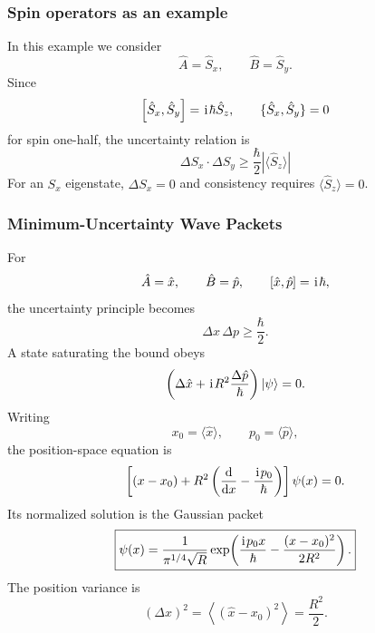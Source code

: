 \subsubsection{Spin operators as an example}
In this example we consider
\begin{equation}
 \hat A=\hat S_x,
 \qquad
 \hat B=\hat S_y.
\end{equation}
Since
\begin{equation}
 \left[\hat S_x,\hat S_y\right]=\hspace{1pt}\mathrm{i}\hspace{1pt}\hbar\hat S_z,
 \qquad
 \{\hat S_x,\hat S_y\}=0
\end{equation}
for spin one-half, the uncertainty relation is
\begin{equation}
 \Delta S_x\cdot \Delta S_y
 \geq\frac{\hbar}{2}|\langle\hat S_z\rangle|
\end{equation}
For an $S_x$ eigenstate, $\Delta S_x=0$ and consistency requires
$\langle\hat S_z\rangle=0$.

\subsubsection{Minimum-Uncertainty Wave Packets}
For
\begin{equation}
 \hat A=\hat x,
 \qquad
 \hat B=\hat p,
 \qquad
 \left[\hat x,\hat p\right]=\hspace{1pt}\mathrm{i}\hspace{1pt}\hbar,
\end{equation}
the uncertainty principle becomes
\begin{equation}
 \boxed{\Delta x\,\Delta p\geq\frac{\hbar}{2}.}
\end{equation}
A state saturating the bound obeys
\begin{equation}
 \left(\Delta\hat x+\hspace{1pt}\mathrm{i}\hspace{1pt} R^2\frac{\Delta\hat p}{\hbar}\right)
 |{\psi}\rangle=0.
\end{equation}
Writing
\begin{equation}
 x_0=\langle\hat x\rangle,
 \qquad
 p_0=\langle\hat p\rangle,
\end{equation}
the position-space equation is
\begin{equation}
 \left[(x-x_0)+R^2\left(\frac{\mathrm{d}{}}{\mathrm{d} x}
 -\frac{\hspace{1pt}\mathrm{i}\hspace{1pt} p_0}{\hbar}\right)\right]\psi(x)=0.
\end{equation}
Its normalized solution is the Gaussian packet
\begin{equation}
 \boxed{
 \psi(x)=\frac{1}{\pi^{1/4}\sqrt R}
 \exp\!\left(\frac{\hspace{1pt}\mathrm{i}\hspace{1pt} p_0x}{\hbar}
 -\frac{(x-x_0)^2}{2R^2}\right).}
\end{equation}
The position variance is
\begin{equation}
 (\Delta x)^2
 =\left\langle(\hat x-x_0)^2\right\rangle
 =\frac{R^2}{2}.
\end{equation}

